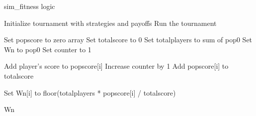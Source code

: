 \documentclass[12pt]{report}
\begin{document}
\begin{algorithm}
\caption{sim\_fitness logic}
\begin{algorithmic}[1]


\State Initialize tournament with strategies and payoffs  
\State Run the tournament

\State Set popscore to zero array  
\State Set totalscore to 0  
\State Set totalplayers to sum of pop0  
\State Set Wn to pop0  
\State Set counter to 1

        \State Add player’s score to popscore[i]  
        \State Increase counter by 1  
    \EndFor
    \State Add popscore[i] to totalscore  
\EndFor

    \State Set Wn[i] to floor(totalplayers * popscore[i] / totalscore)  
\EndFor

\Return Wn
\EndFunction
\end{algorithmic}
\end{algorithm}

\clearpage
\end{document}
